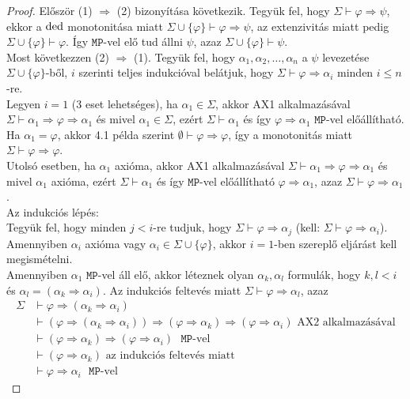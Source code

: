 \begin{proof}
Először (1) $\Rightarrow$ (2) bizonyítása következik. Tegyük fel, hogy $\Sigma \vdash \varphi \Rightarrow \psi$, ekkor a $\mathop{\mathrm{ded}}$ monotonitása miatt $\Sigma \cup \lbrace \varphi \rbrace \vdash \varphi \Rightarrow \psi$, az extenzivitás miatt pedig $\Sigma \cup \lbrace \varphi \rbrace \vdash \varphi$. Így $\texttt{MP}$-vel elő tud állni $\psi$, azaz $\Sigma \cup \lbrace \varphi \rbrace \vdash \psi$. \\
\indent Most következzen (2) $\Rightarrow$ (1). Tegyük fel, hogy $\alpha_1, \alpha_2, \ldots, \alpha_n$ a $\psi$ levezetése $\Sigma \cup \lbrace \varphi \rbrace$-ből, $i$ szerinti teljes indukcióval belátjuk, hogy $\Sigma \vdash \varphi \Rightarrow \alpha_i$ minden $i \leqslant n$-re. \\
\indent Legyen $i=1$ (3 eset lehetséges), ha $\alpha_1 \in \Sigma$, akkor AX1 alkalmazásával $\Sigma \vdash \alpha_1 \Rightarrow \varphi \Rightarrow \alpha_1$ és mivel $\alpha_1 \in \Sigma$, ezért $\Sigma \vdash \alpha_1$ és így $\varphi \Rightarrow \alpha_1$ $\texttt{MP}$-vel előállítható. \\
\indent Ha $\alpha_1 = \varphi$, akkor 4.1 példa szerint $\emptyset \vdash \varphi \Rightarrow \varphi$, így a monotonitás miatt $\Sigma \vdash \varphi \Rightarrow \varphi$. \\
\indent Utolsó esetben, ha $\alpha_1$ axióma, akkor AX1 alkalmazásával $\Sigma \vdash \alpha_1 \Rightarrow \varphi \Rightarrow \alpha_1$ és mivel $\alpha_1$ axióma, ezért $\Sigma \vdash \alpha_1$ és így $\texttt{MP}$-vel előállítható $\varphi \Rightarrow \alpha_1$, azaz $\Sigma \vdash \varphi \Rightarrow \alpha_1$.\\
\indent Az indukciós lépés: \\
Tegyük fel, hogy minden $j < i$-re tudjuk, hogy $\Sigma \vdash \varphi \Rightarrow \alpha_j$ (kell: $\Sigma \vdash \varphi \Rightarrow \alpha_i$). Amennyiben $\alpha_i$ axióma vagy $\alpha_i \in \Sigma \cup \lbrace \varphi \rbrace$, akkor $i=1$-ben szereplő eljárást kell megismételni. \\
\indent Amennyiben $\alpha_1$ $\texttt{MP}$-vel áll elő, akkor léteznek olyan $\alpha_k, \alpha_l$ formulák, hogy $k,l < i$ és $\alpha_l = (\alpha_k \Rightarrow \alpha_i)$. Az indukciós feltevés miatt $\Sigma \vdash \varphi \Rightarrow \alpha_l$, azaz 
\begin{equation*}
\begin{split}
\Sigma &\vdash \varphi \Rightarrow (\alpha_k \Rightarrow \alpha_i) \\
& \vdash (\varphi \Rightarrow (\alpha_k \Rightarrow \alpha_i)) \Rightarrow (\varphi \Rightarrow \alpha_k) \Rightarrow (\varphi \Rightarrow \alpha_i) \text{ AX2 alkalmazásával} \\
& \vdash (\varphi \Rightarrow \alpha_k) \Rightarrow (\varphi \Rightarrow \alpha_i) \text{ $\texttt{MP}$-vel} \\
& \vdash (\varphi \Rightarrow \alpha_k) \text{ az indukciós feltevés miatt} \\ 
& \vdash \varphi \Rightarrow \alpha_i \text{ $\texttt{MP}$-vel}
\end{split}
\end{equation*}
\end{proof}
